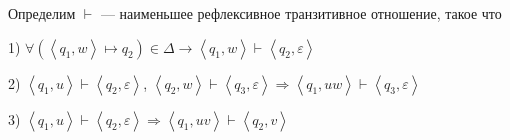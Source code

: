 \begin{define*}
Определим $\vdash$ --- наименьшее рефлексивное транзитивное отношение,
такое что

1) $\forall\left(\left\langle q_{1},w\right\rangle \mapsto q_{2}\right)\in\Delta\rightarrow\left\langle q_{1},w\right\rangle \vdash\left\langle q_{2},\varepsilon\right\rangle $

2) $\left\langle q_{1},u\right\rangle \vdash\left\langle q_{2},\varepsilon\right\rangle $,
$\left\langle q_{2},w\right\rangle \vdash\left\langle q_{3},\varepsilon\right\rangle \Rightarrow\left\langle q_{1},uw\right\rangle \vdash\left\langle q_{3},\varepsilon\right\rangle $

3) $\left\langle q_{1},u\right\rangle \vdash\left\langle q_{2},\varepsilon\right\rangle \Rightarrow\left\langle q_{1},uv\right\rangle \vdash\left\langle q_{2},v\right\rangle $
\end{define*}

